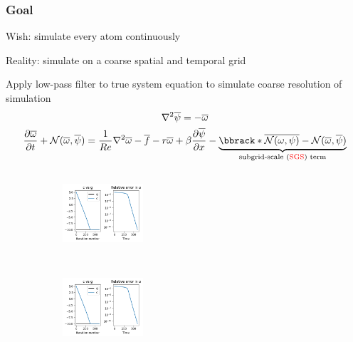 \documentclass{beamer}
\newcommand{\ol}{\overline}
\begin{document}
\begin{frame}
  \frametitle{Goal}
  Wish: simulate every atom continuously

  Reality: simulate on a coarse spatial and temporal grid
  \newline

  Apply low-pass filter to true system equation to simulate coarse resolution
  of simulation
  \begin{equation}
    \begin{gathered}
      \nabla^2 \ol \psi = - \ol \omega \\
      \frac{\partial \ol \omega}{\partial t} + \mathcal N(\ol \omega, \ol \psi)
      = \frac1{Re} \nabla^2 \ol \omega - \ol f - r \ol \omega
      + \beta \frac{\partial \ol \psi}{\partial x}
      - \underbrace{
        \bbrack*{\ol{\mathcal N(\omega, \psi)}
        - \mathcal N(\ol \omega, \ol \psi)}
      }_{\text{subgrid-scale (} \textcolor{red}{\text{SGS}} \text{) term}}
    \end{gathered}
  \end{equation}

  \begin{figure}
    \centering
    \begin{subfigure}{0.45\textwidth}
      \centering
      \includegraphics[width=3cm, height=3cm, keepaspectratio]{placeholder.png}
    \end{subfigure}
    \begin{subfigure}{0.45\textwidth}
      \centering
      \includegraphics[width=3cm, height=3cm, keepaspectratio]{placeholder.png}
    \end{subfigure}
  \end{figure}
\end{frame}
\end{document}
